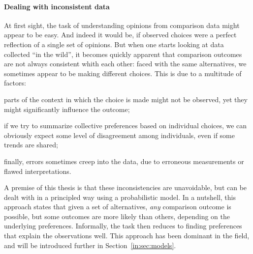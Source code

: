 \paragraph{Dealing with inconsistent data}
At first sight, the task of understanding opinions from comparison data might appear to be easy.
And indeed it would be, if observed choices were a perfect reflection of a single set of opinions.
But when one starts looking at data collected ``in the wild'', it becomes quickly apparent that comparison outcomes are not always consistent whith each other:
faced with the same alternatives, we sometimes appear to be making different choices.
This is due to a multitude of factors:
\begin{enuminline}
\item parts of the context in which the choice is made might not be observed, yet they might significantly influence the outcome;
\item if we try to summarize collective preferences based on individual choices, we can obviously expect some level of disagreement among individuals, even if some trends are shared;
\item finally, errors sometimes creep into the data, due to erroneous measurements or flawed interpretations.
\end{enuminline}
A premise of this thesis is that these inconsistencies are unavoidable, but can be dealt with in a principled way using a probabilistic model.
In a nutshell, this approach states that given a set of alternatives, \emph{any} comparison outcome is possible, but some outcomes are more likely than others, depending on the underlying preferences.
Informally, the task then reduces to finding preferences that explain the observations well.
This approach has been dominant in the field, and will be introduced further in Section~\ref{in:sec:models}.


